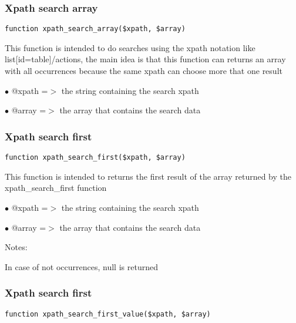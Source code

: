 \documentclass[a4paper]{article}
\begin{document}
\hypertarget{toc65}{}
\subsubsection{Xpath search array}

\begin{lstlisting}
function xpath_search_array($xpath, $array)
\end{lstlisting}

This function is intended to do searches using the xpath notation
like list[id=table]/actions, the main idea is that this function can
returns an array with all occurrences because the same xpath can choose
more that one result

\begin{compactitem}
\item[\color{myblue}$\bullet$] @xpath =$>$ the string containing the search xpath
\item[\color{myblue}$\bullet$] @array =$>$ the array that contains the search data
\end{compactitem}

\hypertarget{toc66}{}
\subsubsection{Xpath search first}

\begin{lstlisting}
function xpath_search_first($xpath, $array)
\end{lstlisting}

This function is intended to returns the first result
of the array returned by the xpath\_search\_first function

\begin{compactitem}
\item[\color{myblue}$\bullet$] @xpath =$>$ the string containing the search xpath
\item[\color{myblue}$\bullet$] @array =$>$ the array that contains the search data
\end{compactitem}

Notes:

In case of not occurrences, null is returned

\hypertarget{toc67}{}
\subsubsection{Xpath search first}

\begin{lstlisting}
function xpath_search_first_value($xpath, $array)
\end{lstlisting}
\end{document}
